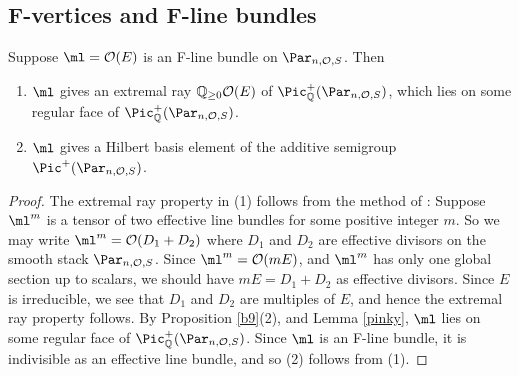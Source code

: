 \subsection{F-vertices and F-line bundles}
\begin{lemma}
\notready\label{elgar}
Suppose $\ml=\mathcal{O}(E)$  is an F-line bundle on $\Par_{n,\mathcal{O},S}$. Then
\begin{enumerate}
\item $\ml$ gives an extremal ray $\Bbb{Q}_{\geq 0}\mathcal{O}(E)$   of $\Pic^+_{\Bbb{Q}}(\Par_{n,\mathcal{O},S})$, which  lies on some regular face of  $\Pic^+_{\Bbb{Q}}(\Par_{n,\mathcal{O},S})$.
\item $\ml$ gives a Hilbert basis element of the additive semigroup $\Pic^+(\Par_{n,\mathcal{O},S})$.
\end{enumerate}
 \end{lemma}
\begin{proof}
The extremal ray property in (1)  follows from  the method of  \cite[Lemma 2.1]{BHermit}: Suppose
$\ml^m$ is a tensor of two effective line bundles for some positive integer $m$. So we may write
$\ml^m=\mathcal{O}(D_1+D_2)$ where $D_1$ and $D_2$ are effective divisors on the smooth stack $\Par_{n,\mathcal{O},S}$. Since $\ml^m=\mathcal{O}(mE)$, and $\ml^m$ has only one global section up to scalars, we should have $mE=D_1+D_2$ as effective divisors. Since $E$ is irreducible, we see that $D_1$ and $D_2$ are multiples of $E$, and hence the extremal ray property follows. By Proposition \ref{b9}(2), and Lemma \ref{pinky}, $\ml$ lies on some regular face of
$\Pic^+_{\Bbb{Q}}(\Par_{n,\mathcal{O},S})$. Since $\ml$ is an F-line bundle, it is indivisible as an effective line bundle, and so (2) follows from (1).

\end{proof}


